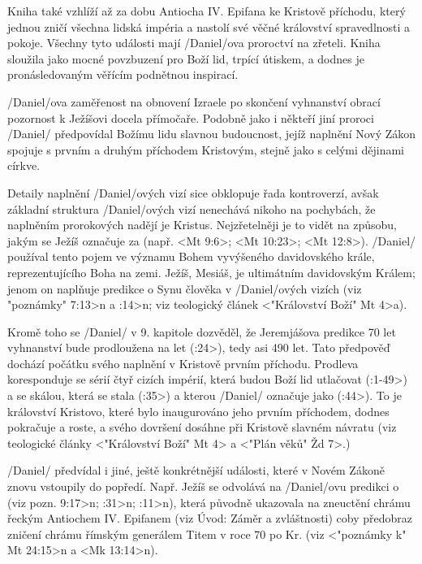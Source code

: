 Kniha také vzhlíží až za dobu Antiocha IV. Epifana ke Kristově příchodu, který jednou zničí všechna lidská impéria a nastolí své věčné království spravedlnosti a pokoje. Všechny tyto události mají \x/Daniel/ova proroctví na zřeteli.
Kniha sloužila jako mocné povzbuzení pro Boží lid, trpící útiskem, a dodnes je pronásledovaným věřícím podnětnou inspirací. 


\x/Daniel/ova zaměřenost na obnovení Izraele po skončení vyhnanství obrací pozornost k Ježíšovi docela přímočaře.
Podobně jako i někteří jiní proroci \x/Daniel/ předpovídal Božímu lidu slavnou budoucnost, jejíž naplnění Nový Zákon 
spojuje s prvním a druhým příchodem Kristovým, stejně jako s celými dějinami církve.

Detaily naplnění \x/Daniel/ových vizí sice obklopuje řada kontroverzí, avšak základní struktura \x/Daniel/ových vizí nenechává nikoho na pochybách, že naplněním prorokových nadějí je Kristus.
Nejzřetelněji je to vidět na způsobu, jakým se Ježíš označuje za  (např. <Mt 9:6>; <Mt 10:23>; <Mt 12:8>).
\x/Daniel/ používal tento pojem ve významu Bohem vyvýšeného davidovského krále, reprezentujícího Boha na zemi.
Ježíš, Mesiáš, je ultimátním davidovským Králem; jenom on naplňuje predikce o Synu člověka v \x/Daniel/ových vizích (viz \<"poznámky" 7:13>n a :14>n; viz teologický článek 
<"Království Boží"  Mt 4>a). 

Kromě toho se \x/Daniel/ v 9. kapitole dozvěděl, že Jeremjášova predikce 70 let vyhnanství bude prodloužena 
na  let (:24>), tedy asi 490 let.
Tato předpověď dochází počátku svého naplnění v Kristově prvním příchodu. Prodleva koresponduje se sérií čtyř cizích impérií, která budou Boží lid utlačovat (:1-49>) a se skálou, která se stala  (:35>) a kterou \x/Daniel/ označuje jako  (:44>). 
To je království Kristovo, které bylo inaugurováno jeho prvním příchodem, dodnes pokračuje a roste, a svého dovršení dosáhne při Kristově slavném návratu (viz teologické články <"Království Boží" Mt 4> a <"Plán věků" Žd 7>.)

\x/Daniel/ předvídal i jiné, ještě konkrétnější události, které v Novém Zákoně znovu vstoupily do popředí.
Např. Ježíš  se odvolává na \x/Daniel/ovu predikci o  (viz \<pozn. 9:17>n; :31>n; :11>n),
která původně ukazovala na zneuctění chrámu řeckým Antiochem IV. Epifanem (viz Úvod: Záměr a zvláštnosti) coby předobraz zničení chrámu  římským generálem Titem v roce 70 po Kr. (viz <"poznámky k" Mt 24:15>n a <Mk 13:14>n).

